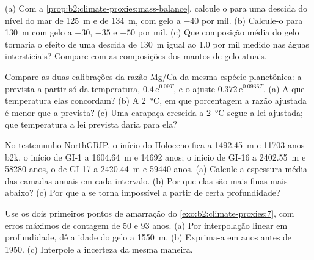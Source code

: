 \begin{exercise}[$\star\star$]\label{exo:b2:climate-proxies:5}
(a) Com a \cref{prop:b2:climate-proxies:mass-balance}, calcule o  para uma descida do
nível do mar de \qty{125}{m} e de \qty{134}{m}, com gelo a $-40$ por mil. (b) Calcule-o para
\qty{130}{m} com gelo a $-30$, $-35$ e $-50$ por mil. (c) Que composição média do gelo
tornaria o efeito de uma descida de \qty{130}{m} igual ao \num{1.0} por mil medido nas águas
intersticiais? Compare com as composições dos mantos de gelo atuais.
\end{exercise}

\begin{exercise}[$\star\star$]\label{exo:b2:climate-proxies:6}
Compare as duas calibrações da razão Mg/Ca da mesma espécie planctônica: a prevista a partir só da
temperatura, $0.4\,\mathrm{e}^{0.09T}$, e o ajuste $0.372\,\mathrm{e}^{0.0936T}$. (a) A
que temperatura elas concordam? (b) A \qty{2}{\celsius}, em que porcentagem a razão ajustada
é menor que a prevista? (c) Uma carapaça crescida a \qty{2}{\celsius} segue a lei ajustada; que
temperatura a lei prevista daria para ela?
\end{exercise}

\begin{exercise}[$\star\star$]\label{exo:b2:climate-proxies:7}
No testemunho NorthGRIP, o início do Holoceno fica a \qty{1492.45}{m} e \num{11703} anos
b2k, o início de GI-1 a \qty{1604.64}{m} e \num{14692} anos; o início de GI-16 a
\qty{2402.55}{m} e \num{58280} anos, o de GI-17 a \qty{2420.44}{m} e \num{59440} anos.
(a) Calcule a espessura média das camadas anuais em cada intervalo. (b) Por que elas são mais finas
mais abaixo? (c) Por que a  se torna impossível a partir de certa profundidade?
\end{exercise}

\begin{exercise}[$\star\star$]\label{exo:b2:climate-proxies:8}
Use os dois primeiros pontos de amarração do \cref{exo:b2:climate-proxies:7}, com erros máximos de contagem de 50
e 93 anos. (a) Por interpolação linear em profundidade, dê a idade do gelo a \qty{1550}{m}.
(b) Exprima-a em anos antes de 1950. (c) Interpole a incerteza da mesma maneira.
\end{exercise}


